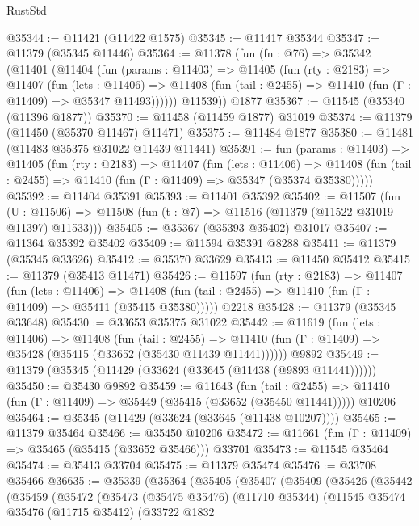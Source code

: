 \begin{lexlean}{RustStd}
\begin{coremodule}
@35344 := @11421 (@11422 @1575)
@35345 := @11417 @35344
@35347 := @11379 (@35345 @11446)
@35364 := @11378
    (fun (fn : @76) =>
    @35342
      (@11401
        (@11404
          (fun (params : @11403) =>
          @11405
            (fun (rty : @2183) =>
            @11407
              (fun (lets : @11406) =>
              @11408 (fun (tail : @2455) => @11410 (fun (Γ : @11409) => @35347 @11493))))))
        @11539))
    @1877
@35367 := @11545 (@35340 (@11396 @1877))
@35370 := @11458 (@11459 @1877) @31019
@35374 := @11379 (@11450 (@35370 @11467) @11471)
@35375 := @11484 @1877
@35380 := @11481 (@11483 @35375 @31022 @11439 @11441)
@35391 := fun (params : @11403) =>
  @11405
    (fun (rty : @2183) =>
    @11407
      (fun (lets : @11406) =>
      @11408 (fun (tail : @2455) => @11410 (fun (Γ : @11409) => @35347 (@35374 @35380)))))
@35392 := @11404 @35391
@35393 := @11401 @35392
@35402 := @11507
    (fun (U : @11506) => @11508 (fun (t : @7) => @11516 (@11379 (@11522 @31019 @11397) @11533)))
@35405 := @35367 (@35393 @35402) @31017
@35407 := @11364 @35392 @35402
@35409 := @11594 @35391 @8288
@35411 := @11379 (@35345 @33626)
@35412 := @35370 @33629
@35413 := @11450 @35412
@35415 := @11379 (@35413 @11471)
@35426 := @11597
    (fun (rty : @2183) =>
    @11407
      (fun (lets : @11406) =>
      @11408 (fun (tail : @2455) => @11410 (fun (Γ : @11409) => @35411 (@35415 @35380)))))
    @2218
@35428 := @11379 (@35345 @33648)
@35430 := @33653 @35375 @31022
@35442 := @11619
    (fun (lets : @11406) =>
    @11408
      (fun (tail : @2455) =>
      @11410 (fun (Γ : @11409) => @35428 (@35415 (@33652 (@35430 @11439 @11441))))))
    @9892
@35449 := @11379 (@35345 (@11429 (@33624 (@33645 (@11438 (@9893 @11441))))))
@35450 := @35430 @9892
@35459 := @11643
    (fun (tail : @2455) => @11410 (fun (Γ : @11409) => @35449 (@35415 (@33652 (@35450 @11441)))))
    @10206
@35464 := @35345 (@11429 (@33624 (@33645 (@11438 @10207))))
@35465 := @11379 @35464
@35466 := @35450 @10206
@35472 := @11661 (fun (Γ : @11409) => @35465 (@35415 (@33652 @35466))) @33701
@35473 := @11545 @35464
@35474 := @35413 @33704
@35475 := @11379 @35474
@35476 := @33708 @35466
@36635 := @35339
    (@35364
      (@35405
        (@35407
          (@35409
            (@35426
              (@35442
                (@35459
                  (@35472
                    (@35473
                      (@35475 @35476)
                      (@11710 @35344)
                      (@11545
                        @35474
                        @35476
                        (@11715 @35412)
                        (@33722
                          @1832

\end{coremodule}
\end{lexlean}
